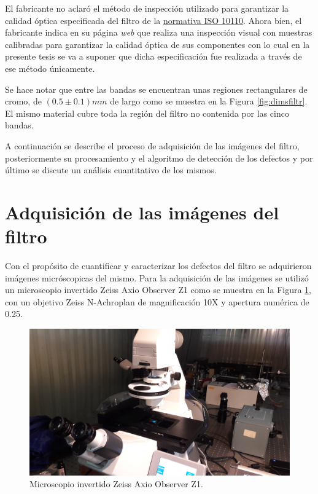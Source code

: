 El fabricante no aclaró el método de inspección utilizado para garantizar la calidad óptica especificada del filtro de la \underline{normativa ISO 10110}. Ahora bien, el fabricante indica en su página \textit{web} que realiza una inspección visual con muestras calibradas para garantizar la calidad óptica de sus componentes con lo cual en la presente tesis se va a suponer que dicha especificación fue realizada a través de ese método únicamente.

Se hace notar que entre las bandas se encuentran unas regiones rectangulares de cromo, de $(0.5 \pm 0.1)mm $ de largo como se muestra en la Figura \ref{fig:dimsfiltr}. El mismo material cubre toda la región del filtro no contenida por las cinco bandas.

A continuación se describe el proceso de adquisición de las imágenes del filtro, posteriormente su procesamiento y el algoritmo de detección de los defectos y por último se discute un análisis cuantitativo de los mismos.

\singlespacing
\section{Adquisición de las imágenes del filtro}
\label{sec:conf}

\hspace{0.5cm}Con el propósito de cuantificar y caracterizar los defectos del filtro se adquirieron imágenes micróscopicas del mismo. Para la adquisición de las imágenes se utilizó un microscopio invertido Zeiss Axio Observer Z1 como se muestra en la Figura \ref{fig:ZEISSdellabo}, con un objetivo Zeiss N-Achroplan de magnificación 10X y apertura numérica de 0.25.
\begin{figure}[H]
	\centering
	\includegraphics[scale=0.1]{Figs/defectosZEISS/b.jpg}
	\caption{Microscopio invertido Zeiss Axio Observer Z1.}
	\label{fig:ZEISSdellabo}
\end{figure}

